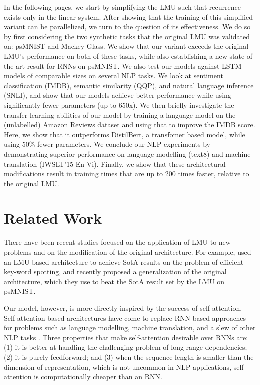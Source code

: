 \documentclass{article}
\begin{document}
In the following pages, we start by simplifying the LMU such that recurrence exists only in the linear system. After showing that the training of this simplified variant can be parallelized, we turn to the question of its effectiveness. We do so by first considering the two synthetic tasks that the original LMU was validated on: psMNIST and Mackey-Glass. We show that our variant  exceeds the original LMU's performance on both of these tasks, while also establishing a new state-of-the-art result for RNNs on psMNIST. We also test our models against LSTM models of comparable sizes on several NLP tasks. We look at sentiment classification (IMDB), semantic similarity (QQP), and natural language inference (SNLI), and show that our models achieve better performance while using significantly fewer parameters (up to 650x). We then briefly investigate the transfer learning abilities of our model by training a language model on the (unlabelled) Amazon Reviews dataset and using that to improve the IMDB score. Here, we show that it outperforms DistilBert, a transfomer based model, while using 50\% fewer parameters. We conclude our NLP experiments by demonstrating superior performance on language modelling (text8) and machine translation (IWSLT'15 En-Vi). Finally, we show that these architectural modifications result in training times that are up to 200 times faster, relative to the original LMU.

\section{Related Work}

There have been recent studies focused on the application of LMU to new problems and on the modification of the original architecture. For example, \citet{blouw2020hardware} used an LMU based architecture to achieve SotA results on the problem of efficient key-word spotting, and \citet{gu2020hippo} recently proposed a generalization of the original architecture, which they use to beat the SotA result set by the LMU on psMNIST. 

Our model, however, is more directly inspired by the success of self-attention. Self-attention based architectures have come to replace RNN based approaches for problems such as language modelling, machine translation, and a slew of other NLP tasks \citep{radford2018improving, raffel2019exploring}. Three properties that make self-attention desirable over RNNs are: (1) it is better at handling the challenging problem of long-range dependencies; (2) it is purely feedforward; and (3) when the sequence length is smaller than the dimension of representation, which is not uncommon in NLP applications, self-attention is computationally cheaper than an RNN.
\end{document}
